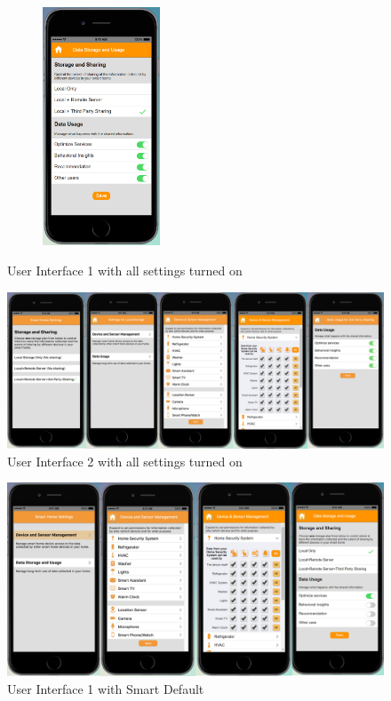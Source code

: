 \begin{figure}
\begin{subfigure}[t]{0.24\textwidth}
	\end{subfigure}%
	~
	\begin{subfigure}[t]{0.24\textwidth}
		\centering
		\includegraphics[height=2.8in]{figures/ui1allOn4.png}
	\end{subfigure}%
	\caption{User Interface 1 with all settings turned on}
	\label{fig:ui1AllOn}
\end{figure}

\begin{figure}
	\centering
	\includegraphics[width=\textwidth]{figures/ui2AllOn.png}
	\caption{User Interface 2 with all settings turned on}
	\label{fig:ui2AllOn}
\end{figure}

\begin{figure}
	\centering
	\includegraphics[width=\textwidth]{figures/ui1OneR.png}
	\caption{User Interface 1 with Smart Default}
	\label{fig:ui1OneR}
\end{figure}

